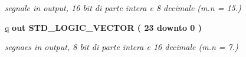 \begin{DoxyCompactItemize}
\begin{DoxyCompactList}\small\item\em segnale in output, 16 bit di parte intera e 8 decimale (m.\+n = 15.) \end{DoxyCompactList}\item 
\hyperlink{group___linear_regression_gacec4f4b6d139d1ada088ca2d3d881418}{q}  {\bfseries {\bfseries \textcolor{vhdlchar}{out}\textcolor{vhdlchar}{ }}} {\bfseries \textcolor{vhdlchar}{S\+T\+D\+\_\+\+L\+O\+G\+I\+C\+\_\+\+V\+E\+C\+T\+OR}\textcolor{vhdlchar}{ }\textcolor{vhdlchar}{(}\textcolor{vhdlchar}{ }\textcolor{vhdlchar}{ } \textcolor{vhdldigit}{23} \textcolor{vhdlchar}{ }\textcolor{vhdlchar}{downto}\textcolor{vhdlchar}{ }\textcolor{vhdlchar}{ } \textcolor{vhdldigit}{0} \textcolor{vhdlchar}{ }\textcolor{vhdlchar}{)}\textcolor{vhdlchar}{ }} 
\begin{DoxyCompactList}\small\item\em segnaes in output, 8 bit di parte intera e 16 decimale (m.\+n = 7.) \end{DoxyCompactList}\end{DoxyCompactItemize}
